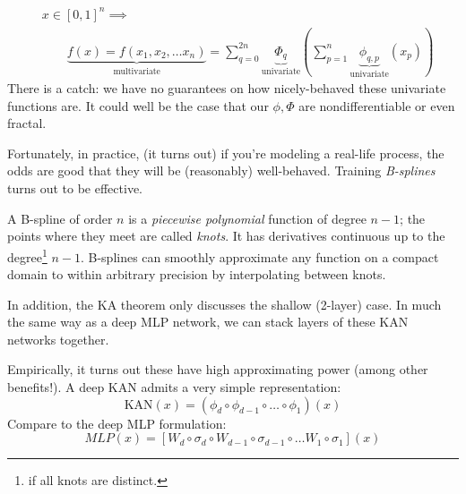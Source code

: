 \begin{frame}
    \begin{align*}
        & x \in [0, 1]^n \implies \\
        & \qquad \underbrace{f(x) = f(x_1, x_2, \ldots x_n)}_{\text{multivariate}}
        = \sum_{q=0}^{2n} \underbrace{\Phi_q}_{\text{univariate}} \left(
            \sum_{p=1}^n \underbrace{\phi_{q, p}}_{\text{univariate}} (x_p)
            \right)
    \end{align*}
    There is a catch: we have no guarantees on how nicely-behaved these univariate functions are.
    It could well be the case that our $\phi, \Phi$ are nondifferentiable or even fractal.
\end{frame}

\begin{frame}
    Fortunately, in practice, (it turns out) if you're modeling a real-life process, the odds are good that they will be 
    (reasonably) well-behaved. Training \textit{B-splines} turns out to be effective.\\
    \begin{defn}
        A B-spline of order $n$ is a \emph{piecewise polynomial} function of degree $n - 1$; the points
        where they meet are called \emph{knots}. It has derivatives continuous up to the degree\footnote{
            if all knots are distinct.
        } $n - 1$. B-splines can smoothly approximate any function on a compact domain to within arbitrary precision
        by interpolating between knots.
    \end{defn}
\end{frame}
\begin{frame}
    In addition, the KA theorem only discusses the shallow (2-layer) case. In
    much the same way as a deep MLP network, we can stack layers of these KAN
    networks together.
\end{frame}

\begin{frame}
    Empirically, it turns out these have high approximating power (among other benefits!).
    A deep KAN admits a very simple representation:
    \[
        \text{KAN}(x) = (\phi_d \circ \phi_{d-1} \circ \ldots \circ \phi_1)(x)
    \]
    Compare to the deep MLP formulation:
    \[
        MLP(x) = \left[
            W_d \circ \sigma_d \circ
            W_{d-1} \circ \sigma_{d-1} \circ
                \ldots
            W_{1} \circ \sigma_{1} 
        \right] (x )
    \]
\end{frame}

